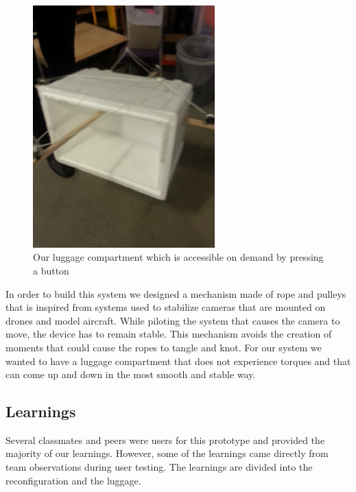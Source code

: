 \begin{figure}[h]
  \centering
     \includegraphics[width=7cm]{images/20140130_170818.jpg}
   \caption{Our luggage compartment which is accessible on demand by pressing a button}
  \label{fig:our_luggage_compartment}
\end{figure}

In order to build this system we designed a mechanism made of rope and pulleys that is inspired from systems used to stabilize cameras that are mounted on drones and model aircraft. While piloting the system that causes the camera to move, the device has to remain stable. This mechanism avoids the creation of moments that could cause the ropes to tangle and knot. For our system we wanted to have a luggage compartment that does not experience torques and that can come up and down in the most smooth and stable way.

\subsection{Learnings}
Several classmates and peers were users for this prototype and provided the majority of our learnings.  However, some of the learnings came directly from team observations during user testing. The learnings are divided into the reconfiguration and the luggage. 


